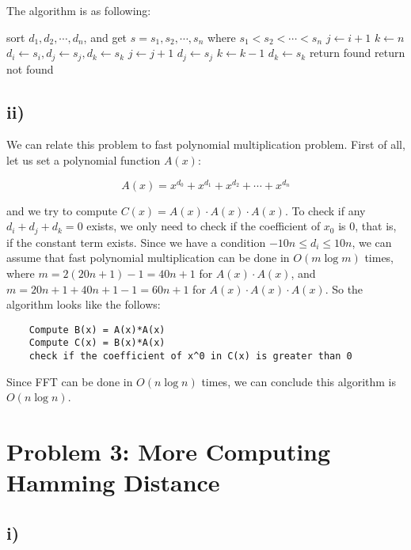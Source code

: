 The algorithm is as following:

\begin{algorithmic}[1]
	\State sort $d_1, d_2, \cdots, d_n$, and get $s = s_1, s_2, \cdots, s_n$ where $s_1 < s_2 < \cdots < s_n$
		\State $j \gets i+1$
		\State $k \gets n$
		\State $d_i \gets s_i, d_j \gets s_j, d_k \gets s_k$
				\State $j \gets j+1$
				\State $d_j \gets s_j$
			\EndIf
				\State $k \gets k-1$
				\State $d_k \gets s_k$
			\EndIf
				\State return found
			\EndIf			
		\EndWhile
	\EndFor
	\State return not found
\EndProcedure
\end{algorithmic}

\subsection*{ii)}

We can relate this problem to fast polynomial multiplication problem.  First of all, let us set a polynomial function $A(x)$:

\[ A(x) = x^{d_0} + x^{d_1} + x^{d_2} + \cdots + x^{d_n} \]

and we try to compute $C(x) = A(x)\cdot A(x)\cdot A(x)$.  To check if any $d_i + d_j + d_k = 0$ exists, we only need to check if the coefficient of $x_0$ is 0, that is, if the constant term exists.  Since we have a condition $-10n \leq d_i \leq 10n$, we can assume that fast polynomial multiplication can be done in $O(m\log m)$ times, where $m = 2(20n+1) - 1 = 40n+1$ for $A(x)\cdot A(x)$, and $m = 20n+1+40n+1-1 = 60n+1$ for $A(x)\cdot A(x) \cdot A(x)$.  So the algorithm looks like the follows:

\begin{verbatim}
    Compute B(x) = A(x)*A(x)
    Compute C(x) = B(x)*A(x)
    check if the coefficient of x^0 in C(x) is greater than 0
\end{verbatim}

Since FFT can be done in $O(n\log n)$ times, we can conclude this algorithm is $O(n\log n)$.

\section*{Problem 3: More Computing Hamming Distance}
\subsection*{i)}

